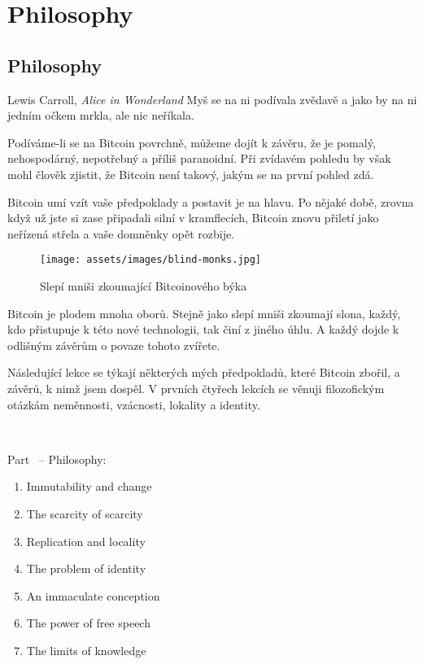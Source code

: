 \part{Philosophy}
\label{ch:philosophy}
\chapter*{Philosophy}

\begin{chapquote}{Lewis Carroll, \textit{Alice in Wonderland}}
Myš se na ni podívala zvědavě a jako by na ni jedním očkem mrkla, ale nic neříkala.
\end{chapquote}

Podíváme-li se na Bitcoin povrchně, můžeme dojít k závěru, že je pomalý, nehospodárný, 
nepotřebný a příliš paranoidní. Při zvídavém pohledu by však mohl člověk zjistit, 
že Bitcoin není takový, jakým se na první pohled zdá.

Bitcoin umí vzít vaše předpoklady a postavit je na hlavu. Po nějaké době, zrovna 
když už jste si zase připadali silní v kramflecích, Bitcoin znovu přiletí jako 
neřízená střela a vaše domněnky opět rozbije.

\begin{figure}
  \texttt{[image: assets/images/blind-monks.jpg]}
  \caption{Slepí mniši zkoumající Bitcoinového býka}
  \label{fig:blind-monks}
\end{figure}

Bitcoin je plodem mnoha oborů. Stejně jako slepí mniši zkoumají slona, každý, kdo 
přistupuje k této nové technologii, tak činí z jiného úhlu. A každý dojde 
k odlišným závěrům o povaze tohoto zvířete.

Následující lekce se týkají některých mých předpokladů, které Bitcoin zbořil, 
a závěrů, k nimž jsem dospěl. V prvních čtyřech lekcích se věnuji filozofickým 
otázkám neměnnosti, vzácnosti, lokality a identity.

~

\begin{samepage}
Part~\ref{ch:philosophy} -- Philosophy:

\begin{enumerate}
  \item Immutability and change
  \item The scarcity of scarcity
  \item Replication and locality
  \item The problem of identity
  \item An immaculate conception
  \item The power of free speech
  \item The limits of knowledge
\end{enumerate}
\end{samepage}


